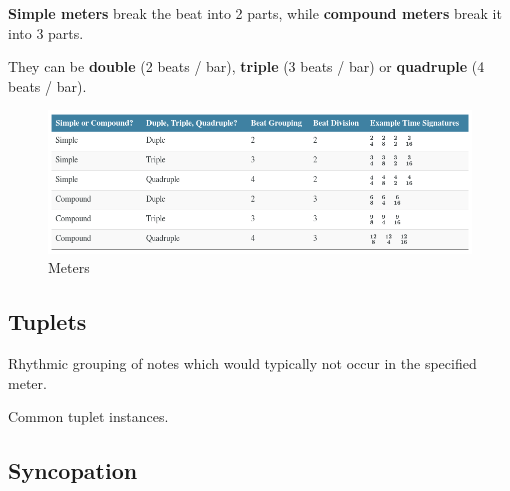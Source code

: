 \textbf{Simple meters} break the beat into 2 parts, while \textbf{compound meters} break it into 3 parts.

They can be \textbf{double} (2 beats / bar), \textbf{triple} (3 beats / bar) or \textbf{quadruple} (4 beats / bar).

\begin{figure}[h]
    \begin{center}
        \includegraphics[width=1\textwidth]{img/meters}
        \caption{Meters}
    \end{center}
\end{figure}

\subsection{Tuplets}
\begin{definition}[Tuplet]
    Rhythmic grouping of notes which would typically not occur in the specified meter.
\end{definition}

\begin{definition}
    Common tuplet instances.
\end{definition}

\subsection{Syncopation}